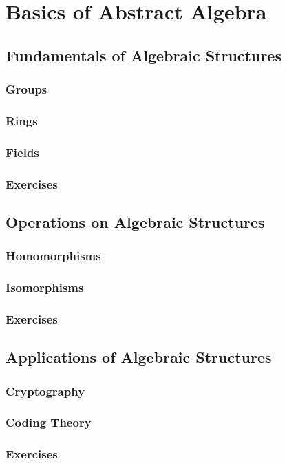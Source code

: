 \chapterspaceabove{6.75cm} 
\chapterspacebelow{7.25cm} 
\chapter{Basics of Abstract Algebra}
\lipsum
\section{Fundamentals of Algebraic Structures}
    \subsection{Groups}
    \subsection{Rings}
    \subsection{Fields}
    \subsection{Exercises}
\section{Operations on Algebraic Structures}
    \subsection{Homomorphisms}
    \subsection{Isomorphisms}
    \subsection{Exercises}
\section{Applications of Algebraic Structures}
    \subsection{Cryptography}
    \subsection{Coding Theory}
    \subsection{Exercises}
